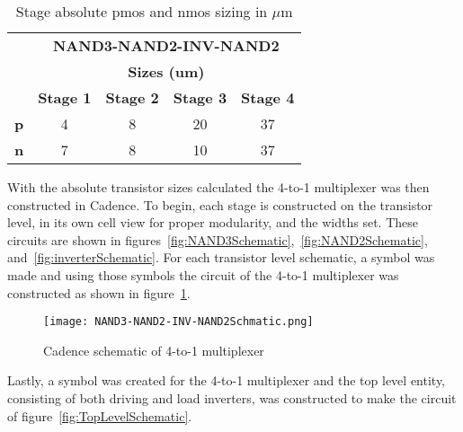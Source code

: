 \documentclass[conference]{IEEEtran}
\begin{document}
\begin{table}[H]
\center
\begin{tabular}{l|c|c|c|c|}
\cline{2-5}
                                 & \multicolumn{4}{c|}{\textbf{NAND3-NAND2-INV-NAND2}}                                                                                                           \\ \cline{2-5} 
                                 & \multicolumn{4}{c|}{\textbf{Sizes (um)}}                                                                                                                      \\ \cline{2-5} 
                                 & \multicolumn{1}{l|}{\textbf{Stage 1}} & \multicolumn{1}{l|}{\textbf{Stage 2}} & \multicolumn{1}{l|}{\textbf{Stage 3}} & \multicolumn{1}{l|}{\textbf{Stage 4}} \\ \hline
\multicolumn{1}{|l|}{\textbf{p}} & 4                                     & 8                                     & 20                                    & 37                                    \\ \hline
\multicolumn{1}{|l|}{\textbf{n}} & 7                                     & 8                                     & 10                                    & 37                                    \\ \hline
\end{tabular}
\label{tab:AbsoluteStageSizeCalcs}
\caption{Stage absolute pmos and nmos sizing in $\mu$m}
\end{table}

With the absolute transistor sizes calculated the 4-to-1 multiplexer was then constructed in Cadence. To begin, each stage is constructed on the transistor level, in its own cell view for proper modularity, and the widths set. These circuits are shown in figures~\ref{fig:NAND3Schematic},~\ref{fig:NAND2Schematic}, and~\ref{fig:inverterSchematic}. For each transistor level schematic, a symbol was made and using those symbols the circuit of the 4-to-1 multiplexer was constructed as shown in figure~\ref{fig:MuxSchematic}.

  \begin{figure}[H]
  \center
    \texttt{[image: NAND3-NAND2-INV-NAND2Schmatic.png]}
    \caption{Cadence schematic of 4-to-1 multiplexer}
    \label{fig:MuxSchematic}
  \end{figure}

  Lastly, a symbol was created for the 4-to-1 multiplexer and the top level entity, consisting of both driving and load inverters, was constructed to make the circuit of figure~\ref{fig:TopLevelSchematic}. 
\end{document}
